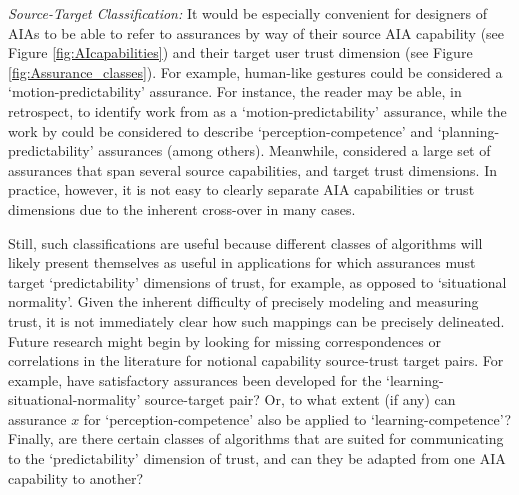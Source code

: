 \emph{Source-Target Classification:}
It would be especially convenient for designers of AIAs to be able to refer to assurances by way of their source AIA capability (see Figure \ref{fig:AIcapabilities}) and their target user trust dimension (see Figure \ref{fig:Assurance_classes}). 
For example, human-like gestures could be considered a `motion-predictability' assurance. For instance, the reader may be able, in retrospect, to identify work from \cite{Dragan2013-wd} as a `motion-predictability' assurance, while the work by \citet{Wang2016-id} could be considered to describe `perception-competence' and `planning-predictability' assurances (among others). Meanwhile, \citet{Aitken2016-fb} considered a large set of assurances that span several source capabilities, and target trust dimensions. In practice, however, it is not easy to clearly separate AIA capabilities or trust dimensions due to the inherent cross-over in many cases. 

Still, such classifications are useful because different classes of algorithms will likely present themselves as useful in applications for which assurances must target `predictability' dimensions of trust, for example, as opposed to `situational normality'. 
Given the inherent difficulty of precisely modeling and measuring trust, it is not immediately clear how such mappings can be precisely delineated.  
Future research might begin by looking for missing correspondences or correlations in the literature for notional capability source-trust target pairs. For example, have satisfactory assurances been developed for the `learning-situational-normality' source-target pair? Or, to what extent (if any) can assurance $x$ for `perception-competence' also be applied to `learning-competence'? Finally, are there certain classes of algorithms that are suited for communicating to the `predictability' dimension of trust, and can they be adapted from one AIA capability to another?
